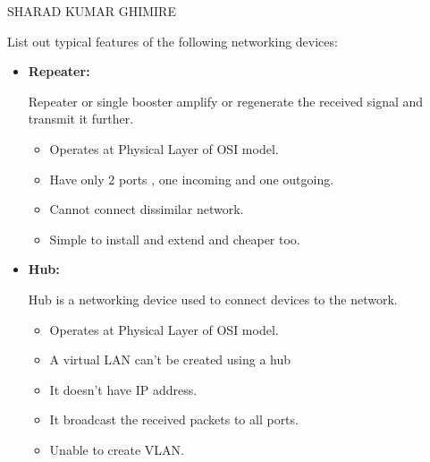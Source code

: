 \documentclass[a4paper,11pt]{article}
\begin{document}
{SHARAD KUMAR GHIMIRE}

\renewcommand{\contentsname}{Table of Contents}
\tableofcontents

\pagebreak
\listoftables

\pagebreak
\listoffigures
\pagebreak
{}



\begin{Q}
    {
        List out typical features of the following networking devices:
    }
\end{Q}
\begin{A}
    {
        \begin{itemize}
            \item {\Large \textbf{ Repeater:}}

                  Repeater or single booster amplify or regenerate the received signal and transmit it further.
                  \begin{itemize}
                      \item Operates at Physical Layer of OSI model.
                      \item  Have only 2 ports , one incoming and one outgoing.
                      \item  Cannot connect dissimilar network.
                      \item  Simple to install and extend and cheaper too.
                  \end{itemize}


            \item {\Large \textbf{ Hub:}}

                  Hub is a networking device used to connect devices to the network.
                  \begin{itemize}
                      \item Operates at Physical Layer of OSI model.
                      \item A virtual LAN can't be created using a hub
                      \item It doesn't have IP address.
                      \item It broadcast the received packets to all ports.
                      \item Unable to create VLAN.
                  \end{itemize}


\end{itemize}}
\end{A}
\end{document}
